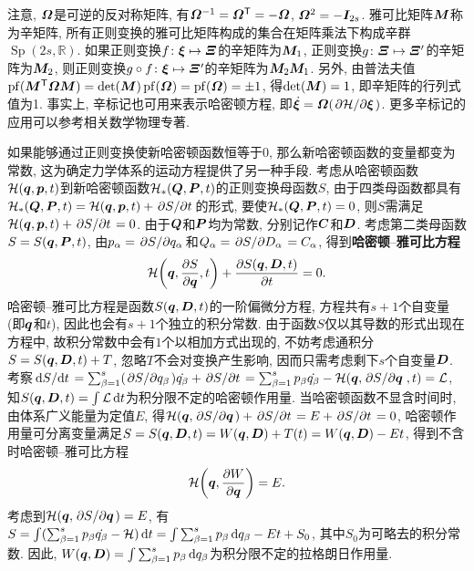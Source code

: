 \begin{proposition}[辛标记]
\begin{equation}
    \end{equation}
    注意, $ \vb*{\varOmega} $是可逆的反对称矩阵, 有$ \vb*{\varOmega}^{-1}={\vb*{\varOmega}}^{\mathsf{T}}=-\vb*{\varOmega} $, $ \vb*{\varOmega}^2=-\vb*{I}_{2s} $. 雅可比矩阵$ \vb*{M} $称为辛矩阵, 所有正则变换的雅可比矩阵构成的集合在矩阵乘法下构成辛群$ \mathop{\mathrm{Sp}}(2s,\mathbb{R}) $. 如果正则变换$ f \colon \vb*{\xi} \mapsto \vb*{\varXi} $的辛矩阵为$ \vb*{M}_1 $, 正则变换$ g \colon \vb*{\varXi} \mapsto \vb*{\varXi}' $的辛矩阵为$ \vb*{M}_2 $, 则正则变换$ g \circ f \colon \vb*{\xi} \mapsto \vb*{\varXi}' $的辛矩阵为$ \vb*{M}_2 \vb*{M}_1 $. 另外, 由普法夫值$ \mathop{\mathrm{pf}}({\vb*{M}}^{\mathsf{T}}\vb*{\varOmega}\vb*{M})=\det(\vb*{M})\mathop{\mathrm{pf}}(\vb*{\varOmega})=\mathop{\mathrm{pf}}(\vb*{\varOmega}) = \pm 1 $, 得$ \det(\vb*{M})=1 $, 即辛矩阵的行列式值为1. 事实上, 辛标记也可用来表示哈密顿方程, 即$ \dot{\vb*{\xi}}=\vb*{\varOmega}(\pdv*{\mathcal{H}}{\vb*{\xi}}) $. 更多辛标记的应用可以参考相关数学物理专著.
\end{proposition}

如果能够通过正则变换使新哈密顿函数恒等于0, 那么新哈密顿函数的变量都变为常数, 这为确定力学体系的运动方程提供了另一种手段. 考虑从哈密顿函数$ \mathcal{H}(\vb*{q},\vb*{p},t) $到新哈密顿函数$ \mathcal{H}_*(\vb*{Q},\vb*{P},t) $的正则变换母函数$ S $, 由于四类母函数都具有$ \mathcal{H}_*(\vb*{Q},\vb*{P},t) = \mathcal{H}(\vb*{q},\vb*{p},t) + \pdv*{S}{t} $的形式, 要使$ \mathcal{H}_*(\vb*{Q},\vb*{P},t)=0 $, 则$ S $需满足$ \mathcal{H}(\vb*{q},\vb*{p},t) + \pdv*{S}{t} = 0 $. 由于$ \vb*{Q} $和$ \vb*{P} $均为常数, 分别记作$ \vb*{C} $和$ \vb*{D} $. 考虑第二类母函数$ S=S(\vb*{q},\vb*{P},t) $, 由$ p_{\alpha}=\pdv*{S}{q_{\alpha}} $和$ Q_{\alpha}=\pdv*{S}{D_{\alpha}}=C_{\alpha} $, 得到\textbf{哈密顿}--\textbf{雅可比方程}
\begin{equation}
    \mathcal{H}\bigg(\vb*{q},\pdv{S}{\vb*{q}},t\bigg) + \pdv{S(\vb*{q},\vb*{D},t)}{t} = 0.
\end{equation}
哈密顿{--}雅可比方程是函数$ S(\vb*{q},\vb*{D},t) $的一阶偏微分方程, 方程共有$ s+1 $个自变量(即$ \vb*{q} $和$ t $), 因此也会有$ s+1 $个独立的积分常数. 由于函数$ S $仅以其导数的形式出现在方程中, 故积分常数中会有$ 1 $个以相加方式出现的, 不妨考虑通积分$ S=S(\vb*{q},\vb*{D},t)+T $, 忽略$ T $不会对变换产生影响, 因而只需考虑剩下$ s $个自变量$ \vb*{D} $. 考察$ \dv*{S}{t} = \sum_{\beta=1}^s (\pdv*{S}{q_{\beta}})\dot{q_{\beta}} + \pdv*{S}{t} = \sum_{\beta=1}^s p_{\beta}\dot{q_{\beta}} - \mathcal{H}(\vb*{q},\pdv*{S}{\vb*{q}},t) = \mathcal{L} $, 知$ S(\vb*{q},\vb*{D},t) = \int \mathcal{L} \dd{t} $为积分限不定的哈密顿作用量. 当哈密顿函数不显含时间时, 由体系广义能量为定值$ E $, 得$ \mathcal{H}(\vb*{q},\pdv*{S}{\vb*{q}}) + \pdv*{S}{t} = E + \pdv*{S}{t} = 0 $, 哈密顿作用量可分离变量满足$ S=S(\vb*{q},\vb*{D},t)=W(\vb*{q},\vb*{D})+T(t)=W(\vb*{q},\vb*{D})-Et $, 得到不含时哈密顿{--}雅可比方程
\begin{equation}
    \mathcal{H}\bigg(\vb*{q},\pdv{W}{\vb*{q}}\bigg) = E.
\end{equation}
考虑到$ \mathcal{H}(\vb*{q},\pdv*{S}{\vb*{q}}) = E $, 有$ S = \int(\sum_{\beta=1}^s p_{\beta} \dot{q_\beta} - \mathcal{H})\dd{t} = \int\sum_{\beta=1}^s p_{\beta} \dd{q_{\beta}} -Et + S_0 $, 其中$ S_0 $为可略去的积分常数. 因此, $ W(\vb*{q},\vb*{D}) = \int \sum_{\beta=1}^s p_{\beta} \dd{q_{\beta}} $为积分限不定的拉格朗日作用量.

